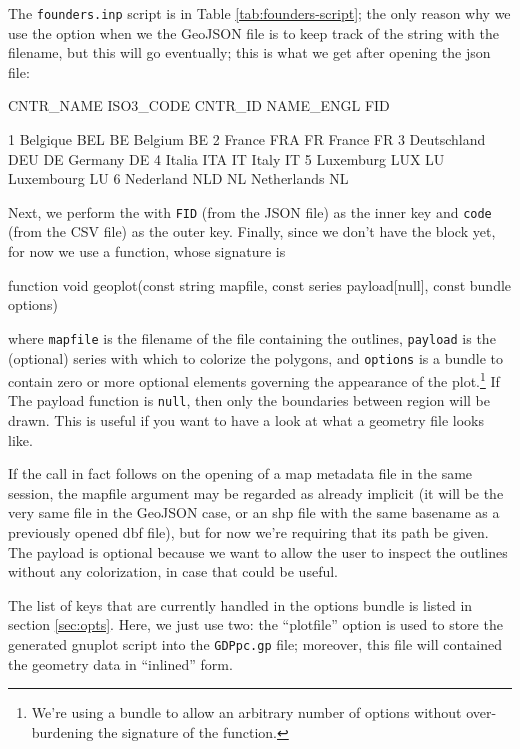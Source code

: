 \documentclass[a4paper]{article}
\begin{document}
The \texttt{founders.inp} script is in Table
\ref{tab:founders-script}; the only reason why we use the
 option when we  the GeoJSON file is to
keep track of the string with the filename, but this will go
eventually; this is what we get after opening the json file:
\begin{code}
     CNTR_NAME    ISO3_CODE      CNTR_ID    NAME_ENGL          FID

1     Belgique          BEL           BE      Belgium           BE
2       France          FRA           FR       France           FR
3  Deutschland          DEU           DE      Germany           DE
4       Italia          ITA           IT        Italy           IT
5    Luxemburg          LUX           LU   Luxembourg           LU
6    Nederland          NLD           NL  Netherlands           NL
\end{code}

Next, we perform the  with \texttt{FID} (from the JSON file)
as the inner key and \texttt{code} (from the CSV file) as the outer
key. Finally, since we don't have the  block yet, for now
we use a  function, whose signature is
\begin{code}
function void geoplot(const string mapfile,
	const series payload[null],
	const bundle options)
\end{code}
where \texttt{mapfile} is the filename of the file containing the
outlines, \texttt{payload} is the (optional) series with which to
colorize the polygons, and \texttt{options} is a bundle to contain
zero or more optional elements governing the appearance of the
plot.\footnote{ We're using a bundle to allow an arbitrary number of options
without over-burdening the signature of the function.} If The payload
function is \texttt{null}, then only the boundaries between region
will be drawn. This is useful if you want to have a look at what a
geometry file looks like.

If the  call in fact follows on the opening of a map
metadata file in the same session, the mapfile argument may be
regarded as already implicit (it will be the very same file in the
GeoJSON case, or an shp file with the same basename as a previously
opened dbf file), but for now we're requiring that its path be
given. The payload is optional because we want to allow the user to
inspect the outlines without any colorization, in case that could be
useful.

The list of keys that are currently handled in the options bundle is
listed in section \ref{sec:opts}. Here, we just use two: the
``plotfile'' option is used to store the generated gnuplot script into
the \texttt{GDPpc.gp} file; moreover, this file will contained the
geometry data in ``inlined'' form.
\end{document}

